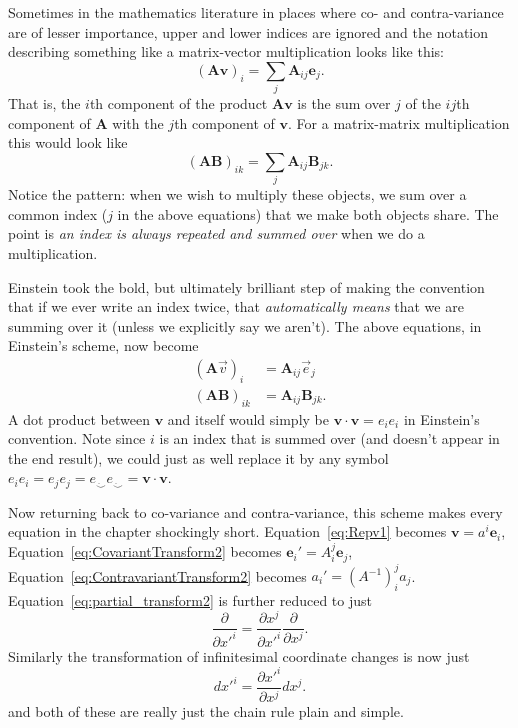 \documentclass[../master.tex]{subfiles}
\begin{document}
	Sometimes in the mathematics literature in places where co- and contra-variance are of lesser importance, upper and lower indices are ignored and the notation describing something like a matrix-vector multiplication looks like this:
	\begin{equation*}
		(\mathbf A \mathbf v)_i = \sum_{j} \mathbf A_{ij} \mathbf e_j.
	\end{equation*}
	That is, the $i$th component of the product $\mathbf A \mathbf v$ is the sum over $j$ of the $ij$th component of $\mathbf A$ with the $j$th component of $\mathbf v$. For a matrix-matrix multiplication this would look like
	\begin{equation*}
		(\mathbf A \mathbf{B})_{ik} = \sum_{j} \mathbf A_{ij} \mathbf B_{jk}.
	\end{equation*}
	Notice the pattern: when we wish to multiply these objects, we sum over a common index ($j$ in the above equations) that we make both objects share. The point is \emph{an index is always repeated and summed over} when we do a multiplication. 
	
	Einstein took the bold, but ultimately brilliant step of making the convention that if we ever write an index twice, that \emph{automatically means} that we are summing over it (unless we explicitly say we aren't). The above equations, in Einstein's scheme, now become
	\begin{align*}
		(\mathbf A \vec v)_i & =  \mathbf A_{ij} \vec e_j \\
		(\mathbf A \mathbf{B})_{ik} & = \mathbf A_{ij} \mathbf B_{jk}.
	\end{align*}
	A dot product between $\mathbf v$ and itself would simply be $\mathbf v\cdot \mathbf v = e_i e_i$ in Einstein's convention. Note since $i$ is an index that is summed over (and doesn't appear in the end result), we could just as well replace it by any symbol $e_i e_i = e_j e_j = e_{\ddot \smile} e_{\ddot \smile} = \mathbf v \cdot \mathbf v$.
	
	Now returning back to co-variance and contra-variance, this scheme makes every equation in the chapter shockingly short. Equation~\eqref{eq:Repv1} becomes $\mathbf v = a^i \mathbf e_i$, Equation~\eqref{eq:CovariantTransform2} becomes $\mathbf e_i' = A^j_i \mathbf e_j$, Equation~\eqref{eq:ContravariantTransform2} becomes $a_i' = (A^{-1})^j_i a_j$. Equation~\eqref{eq:partial_transform2} is further reduced to just 
	\begin{equation}\label{eq:covariant_einstein}
		\frac{\partial}{\partial {x'}^i} = \frac{\partial x^j}{\partial {x'}^i} \frac{\partial}{\partial x^j}.
	\end{equation}
	Similarly the transformation of infinitesimal coordinate changes is now just
	\begin{equation}\label{eq:contravariant_einstein}
		dx'^i = \frac{\partial {x'}^i}{\partial x^j} dx^j.
	\end{equation}
	and both of these are really just the chain rule plain and simple.
	
\end{document}
